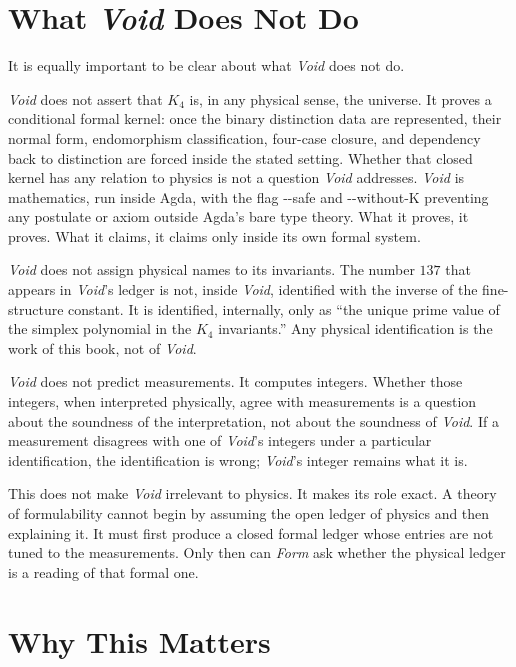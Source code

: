 \documentclass[11pt,a4paper]{book}
\newcommand{\AgdaFlag}[1]{\texttt{-{}-#1}}
\def\texttt#1{#1}%
\begin{document}
\section*{What \textit{Void} Does Not Do}

It is equally important to be clear about what \textit{Void} does not do.

\textit{Void} does not assert that $K_4$ is, in any physical sense, the universe. It proves a conditional formal kernel: once the binary distinction data are represented, their normal form, endomorphism classification, four-case closure, and dependency back to distinction are forced inside the stated setting. Whether that closed kernel has any relation to physics is not a question \textit{Void} addresses. \textit{Void} is mathematics, run inside Agda, with the flag \AgdaFlag{safe} and \AgdaFlag{without-K} preventing any postulate or axiom outside Agda's bare type theory. What it proves, it proves. What it claims, it claims only inside its own formal system.

\textit{Void} does not assign physical names to its invariants. The number $137$ that appears in \textit{Void}'s ledger is not, inside \textit{Void}, identified with the inverse of the fine-structure constant. It is identified, internally, only as ``the unique prime value of the simplex polynomial in the $K_4$ invariants.'' Any physical identification is the work of this book, not of \textit{Void}.

\textit{Void} does not predict measurements. It computes integers. Whether those integers, when interpreted physically, agree with measurements is a question about the soundness of the interpretation, not about the soundness of \textit{Void}. If a measurement disagrees with one of \textit{Void}'s integers under a particular identification, the identification is wrong; \textit{Void}'s integer remains what it is.

This does not make \textit{Void} irrelevant to physics. It makes its role exact. A theory of formulability cannot begin by assuming the open ledger of physics and then explaining it. It must first produce a closed formal ledger whose entries are not tuned to the measurements. Only then can \textit{Form} ask whether the physical ledger is a reading of that formal one.

\section*{Why This Matters}
\end{document}
